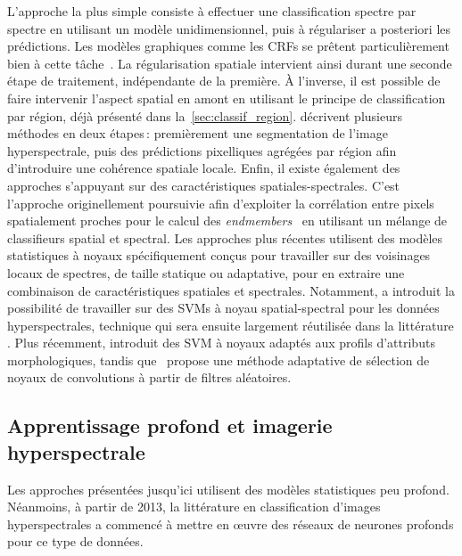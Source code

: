 L'approche la plus simple consiste à effectuer une classification spectre par spectre en utilisant un modèle unidimensionnel, puis à régulariser a posteriori les prédictions. Les modèles graphiques comme les \glspl{CRF} se prêtent particulièrement bien à cette tâche~\cite{wu_semi-supervised_2016}. La régularisation spatiale intervient ainsi durant une seconde étape de traitement, indépendante de la première.
À l'inverse, il est possible de faire intervenir l'aspect spatial en amont en utilisant le principe de classification par région, déjà présenté dans la~\cref{sec:classif_region}. \citet{tarabalka_segmentation_2010,fauvel_advances_2013} décrivent plusieurs méthodes en deux étapes\,: premièrement une segmentation de l'image hyperspectrale, puis des prédictions pixelliques agrégées par région afin d'introduire une cohérence spatiale locale.
Enfin, il existe également des approches s'appuyant sur des caractéristiques spatiales-spectrales. C'est l'approche originellement poursuivie afin d'exploiter la corrélation entre pixels spatialement proches pour le calcul des \textit{endmembers}~\cite{plaza_spatial/spectral_2002,dellacqua_exploiting_2004} en utilisant un mélange de classifieurs spatial et spectral. Les approches plus récentes utilisent des modèles statistiques à noyaux spécifiquement conçus pour travailler sur des voisinages locaux de spectres, de taille statique ou adaptative, pour en extraire une combinaison de caractéristiques spatiales et spectrales. Notamment, \citet{camps-valls_composite_2006} a introduit la possibilité de travailler sur des \glspl{SVM} à noyau spatial-spectral pour les données hyperspectrales, technique qui sera ensuite largement réutilisée dans la littérature \cite{tarabalka_spectralspatial_2009,fauvel_spatial-spectral_2012}. Plus récemment, \citet{cui_scalable_2017} introduit des \gls{SVM} à noyaux adaptés aux profils d'attributs morphologiques, tandis que~\citet{tuia_multiclass_2015} propose une méthode adaptative de sélection de noyaux de convolutions à partir de filtres aléatoires.

\subsection{Apprentissage profond et imagerie hyperspectrale}
\label{sec:deep_hsi}

Les approches présentées jusqu'ici utilisent des modèles statistiques peu profond. Néanmoins, à partir de 2013, la littérature en classification d'images hyperspectrales a commencé à mettre en \oe{}uvre des réseaux de neurones profonds pour ce type de données.

